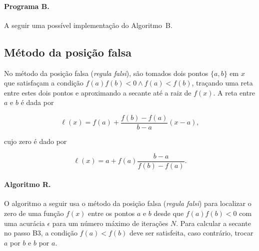 \paragraph{Programa B.} A seguir uma possível implementação 
do Algoritmo~B.



\pagebreak
\subsection*{Método da posição falsa}

No método da posição falsa ({\it regula falsi\/}), 
são tomados dois pontos $\{a,b\}$ em $x$ que satisfaçam 
a condição $f(a)f(b)<0 \land f(a)<f(b)$, traçando 
uma reta entre estes dois pontos e aproximando a 
secante até a raiz de $f(x)$. A reta entre $a$ 
e $b$ é dada por

\begin{equation}
	\ell(x) = f(a) + \frac{f(b)-f(a)}{b-a}(x-a),
\end{equation}

\noindent cujo zero é dado por

\begin{equation}
	\ell(x) = a + f(a)\frac{b-a}{f(b)-f(a)}.
\end{equation}
 
\paragraph{Algoritmo R.}
O algoritmo a seguir usa o método da posição falsa 
({\it regula falsi\/}) para 
localizar o zero de uma função $f(x)$ 
entre os pontos $a$ e $b$ desde que $f(a)f(b)<0$ 
 com uma acurácia $\epsilon$ para um número máximo 
de iterações $N$. Para calcular a secante no passo
B3, a condição $f(a)<f(b)$ deve ser satisfeita, caso
contrário, trocar $a$ por $b$ e $b$ por $a$.
 
